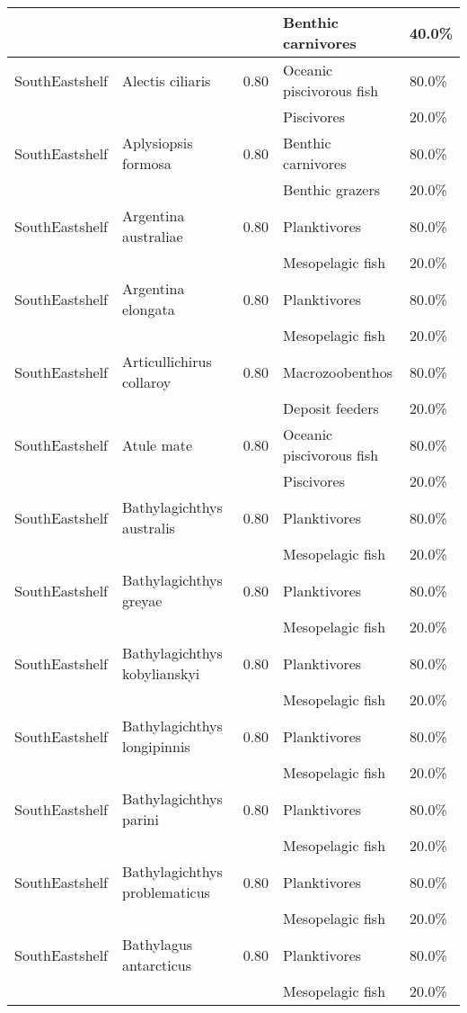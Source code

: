 \begin{longtable}{llcll}
& & & Benthic carnivores & 40.0\% \\
\hline
SouthEastshelf & Alectis ciliaris & 0.80 & Oceanic piscivorous fish & 80.0\% \\
& & & Piscivores & 20.0\% \\
\hline
SouthEastshelf & Aplysiopsis formosa & 0.80 & Benthic carnivores & 80.0\% \\
& & & Benthic grazers & 20.0\% \\
\hline
SouthEastshelf & Argentina australiae & 0.80 & Planktivores & 80.0\% \\
& & & Mesopelagic fish & 20.0\% \\
\hline
SouthEastshelf & Argentina elongata & 0.80 & Planktivores & 80.0\% \\
& & & Mesopelagic fish & 20.0\% \\
\hline
SouthEastshelf & Articullichirus collaroy & 0.80 & Macrozoobenthos & 80.0\% \\
& & & Deposit feeders & 20.0\% \\
\hline
SouthEastshelf & Atule mate & 0.80 & Oceanic piscivorous fish & 80.0\% \\
& & & Piscivores & 20.0\% \\
\hline
SouthEastshelf & Bathylagichthys australis & 0.80 & Planktivores & 80.0\% \\
& & & Mesopelagic fish & 20.0\% \\
\hline
SouthEastshelf & Bathylagichthys greyae & 0.80 & Planktivores & 80.0\% \\
& & & Mesopelagic fish & 20.0\% \\
\hline
SouthEastshelf & Bathylagichthys kobylianskyi & 0.80 & Planktivores & 80.0\% \\
& & & Mesopelagic fish & 20.0\% \\
\hline
SouthEastshelf & Bathylagichthys longipinnis & 0.80 & Planktivores & 80.0\% \\
& & & Mesopelagic fish & 20.0\% \\
\hline
SouthEastshelf & Bathylagichthys parini & 0.80 & Planktivores & 80.0\% \\
& & & Mesopelagic fish & 20.0\% \\
\hline
SouthEastshelf & Bathylagichthys problematicus & 0.80 & Planktivores & 80.0\% \\
& & & Mesopelagic fish & 20.0\% \\
\hline
SouthEastshelf & Bathylagus antarcticus & 0.80 & Planktivores & 80.0\% \\
& & & Mesopelagic fish & 20.0\% \\

\end{longtable}
